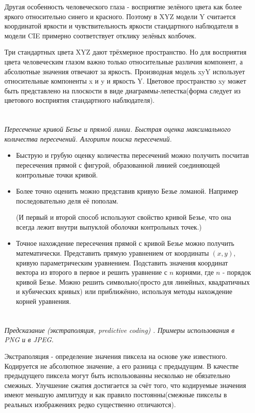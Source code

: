 \documentclass[11pt]{article}
\begin{document}
Другая особенность человеческого глаза - восприятие зелёного цвета как более яркого относительно синего и красного. Поэтому в XYZ модели Y считается координатой яркости и чувствительность яркости стандартного наблюдателя в модели CIE примерно соответствует отклику зелёных колбочек.

Три стандартных цвета XYZ дают трёхмерное пространство. Но для восприятия цвета человеческим глазом важно только относительные различия компонент, а абсолютные значения отвечают за яркость. Производная модель xyY использует относительные компоненты x и y и яркость Y. Цветовое пространство xy может быть представлено на плоскости в виде диаграммы-лепестка(форма следует из цветового восприятия стандартного наблюдателя).

\section{}
\textit{Пересечение кривой Безье и прямой линии. Быстрая оценка максимального количества пересечений. Алгоритм поиска пересечений.}

\begin{itemize}
  \item Быструю и грубую оценку количества пересечений можно получить посчитав пересечения прямой с фигурой, образованной линией соединяющей контрольные точки кривой.
  \item Более точно оценить можно представив кривую Безье ломаной. Например последовательно деля её пополам.

(И первый и второй способ используют свойство кривой Безье, что она всегда лежит внутри выпуклой оболочки контрольных точек.)
  \item Точное нахождение пересечения прямой с кривой Безье можно получить математически. Представить прямую уравнением от координаты $(x,y)$, кривую параметрическим уравнением. Подставить значения координат вектора из второго в первое и решить уравнение с $n$ корнями, где $n$ - порядок кривой Безье. Можно решить символьно(просто для линейных, квадратичных и кубических кривых) или приближённо, используя методы нахождение корней уравнения.
\end{itemize}

\section{}
\textit{Предсказание (экстраполяция, predictive coding) . Примеры использования в PNG и в JPEG.}

Экстраполяция - определение значения пиксела на основе уже известного. Кодируется не абсолютное значение, а его разница с предыдущим. В качестве предыдущего пиксела могут быть использованны несколько не обязательно смежных. Улучшение сжатия достигается за счёт того, что кодируемые значения имеют меньшую амплитуду и как правило постоянны(смежные пикселы в реальных изображениях редко существенно отличаются). 
\end{document}
